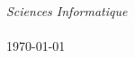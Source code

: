 \begin{titlepage}
\begin{center}

\vfill



\textit{Sciences Informatique}\\[0.3cm] %
\myDepartment \\[2cm]

{\large \today}\\




\end{center}

\end{titlepage}